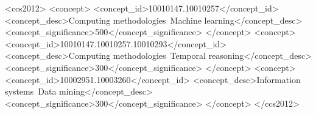 \documentclass[10pt]{article}
\begin{document}

\begin{CCSXML}
<ccs2012>
 <concept>
  <concept_id>10010147.10010257</concept_id>
  <concept_desc>Computing methodologies~Machine learning</concept_desc>
  <concept_significance>500</concept_significance>
 </concept>
 <concept>
  <concept_id>10010147.10010257.10010293</concept_id>
  <concept_desc>Computing methodologies~Temporal reasoning</concept_desc>
  <concept_significance>300</concept_significance>
 </concept>
 <concept>
  <concept_id>10002951.10003260</concept_id>
  <concept_desc>Information systems~Data mining</concept_desc>
  <concept_significance>300</concept_significance>
 </concept>
</ccs2012>
\end{CCSXML}




\newcommand{\df}[1]{{\color{red}DF: #1}}
\maketitle
\end{document}
